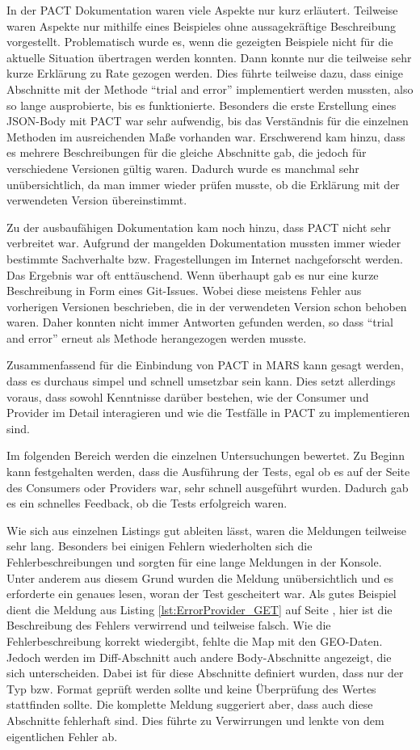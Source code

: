 \documentclass{llncs}
\begin{document}
In der PACT Dokumentation waren viele Aspekte nur kurz erläutert. Teilweise waren Aspekte nur mithilfe eines Beispieles ohne aussagekräftige Beschreibung vorgestellt. Problematisch wurde es, wenn die gezeigten Beispiele nicht für die aktuelle Situation übertragen werden konnten. Dann konnte nur die teilweise sehr kurze Erklärung zu Rate gezogen werden. Dies führte teilweise dazu, dass einige Abschnitte mit der Methode \enquote{trial and error} implementiert werden mussten, also so lange ausprobierte, bis es funktionierte. Besonders die erste Erstellung eines JSON-Body mit PACT war sehr aufwendig, bis das Verständnis für die einzelnen Methoden im ausreichenden Maße vorhanden war. Erschwerend kam hinzu, dass es mehrere Beschreibungen für die gleiche Abschnitte gab, die jedoch für verschiedene Versionen gültig waren. Dadurch wurde es manchmal sehr unübersichtlich, da man immer wieder prüfen musste, ob die Erklärung mit der verwendeten Version übereinstimmt.

Zu der ausbaufähigen Dokumentation kam noch hinzu, dass PACT nicht sehr verbreitet war. Aufgrund der mangelden Dokumentation mussten immer wieder bestimmte Sachverhalte bzw. Fragestellungen im Internet nachgeforscht werden. Das Ergebnis war oft enttäuschend. Wenn überhaupt gab es nur eine kurze Beschreibung in Form eines Git-Issues. Wobei diese meistens Fehler aus vorherigen Versionen beschrieben, die in der verwendeten Version schon behoben waren. Daher konnten nicht immer Antworten gefunden werden, so dass \enquote{trial and error} erneut als Methode herangezogen werden musste.

Zusammenfassend für die Einbindung von PACT in MARS kann gesagt werden, dass es durchaus simpel und schnell umsetzbar sein kann. Dies setzt allerdings voraus, dass sowohl Kenntnisse darüber bestehen, wie der Consumer und Provider im Detail interagieren und wie die Testfälle in PACT zu implementieren sind.

Im folgenden Bereich werden die einzelnen Untersuchungen bewertet. Zu Beginn kann festgehalten werden, dass die Ausführung der Tests, egal ob es auf der Seite des Consumers oder Providers war, sehr schnell ausgeführt wurden. Dadurch gab es ein schnelles Feedback, ob die Tests erfolgreich waren. 

Wie sich aus einzelnen Listings gut ableiten lässt, waren die Meldungen teilweise sehr lang. Besonders bei einigen Fehlern wiederholten sich die Fehlerbeschreibungen und sorgten für eine lange Meldungen in der Konsole. Unter anderem aus diesem Grund wurden die Meldung unübersichtlich und es erforderte ein genaues lesen, woran der Test gescheitert war. Als gutes Beispiel dient die Meldung aus Listing \ref{lst:ErrorProvider_GET} auf Seite \pageref{lst:ErrorProvider_GET}, hier ist die Beschreibung des Fehlers verwirrend und teilweise falsch. Wie die Fehlerbeschreibung korrekt wiedergibt, fehlte die Map mit den GEO-Daten. Jedoch werden im Diff-Abschnitt auch andere Body-Abschnitte angezeigt, die sich unterscheiden. Dabei ist für diese Abschnitte definiert wurden, dass nur der Typ bzw. Format geprüft werden sollte und keine Überprüfung des Wertes stattfinden sollte. Die komplette Meldung suggeriert aber, dass auch diese Abschnitte fehlerhaft sind. Dies führte zu Verwirrungen und lenkte von dem eigentlichen Fehler ab. 
 
\end{document}
